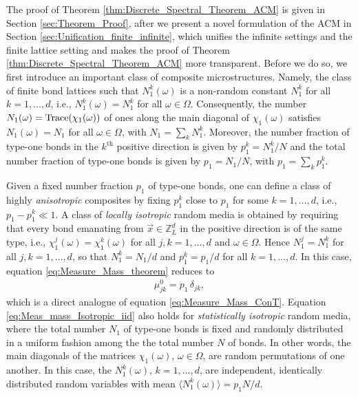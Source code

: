 \documentclass{cmslatex}
\begin{document}
The proof of Theorem \ref{thm:Discrete_Spectral_Theorem_ACM} is given
in Section \ref{sec:Theorem_Proof}, after we present a novel
formulation of the ACM in Section
\ref{sec:Unification_finite_infinite}, which unifies the infinite
settings and the finite lattice setting and makes the proof of
Theorem \ref{thm:Discrete_Spectral_Theorem_ACM} more
transparent. Before we do so, we first introduce an important class of
composite microstructures. Namely, the 
class of finite bond lattices such that $N_1^k(\omega)$ is a non-random
constant $N_1^k$ for all $k=1,\ldots,d$, i.e., $N_1^k(\omega)=N_1^k$ for all
$\omega\in\Omega$. Consequently, the number $N_1(\omega)={\rm Trace}(\chi_1(\omega))$ of ones
along the main diagonal of $\chi_1(\omega)$ satisfies $N_1(\omega)=N_1$ for all
$\omega\in\Omega$, with $N_1=\sum_kN_1^k$. Moreover, the number fraction of type-one
bonds in the $k^{\text{th}}$ positive direction is given by
$p_1^k=N_1^k/N$ and the total number fraction of type-one bonds is
given by $p_1=N_1/N$, with $p_1=\sum_kp_1^k$.





Given a fixed number
fraction $p_1$ of type-one  
bonds, one can define a class of highly \emph{anisotropic} composites
by fixing $p_1^k$ close to $p_1$ for some $k=1,\ldots,d$,
i.e., $p_1-p_1^k\ll1$. A class of \emph{locally isotropic} random media is 
obtained by requiring that every bond emanating from
$\vec{x}\in\mathbb{Z}^d_L$ in the positive direction is of the same
type, i.e., $\chi_1^j(\omega)=\chi_1^k(\omega)$ for all $j,k=1,\ldots,d$ and $\omega\in\Omega$. Hence
$N_1^j=N_1^k$ for all $j,k=1,\ldots,d$, so that $N_1^k=N_1/d$ and
$p_1^k=p_1/d$ for all $k=1,\ldots,d$. In this case, equation
\eqref{eq:Measure_Mass_theorem} reduces to 
% 
\begin{align}\label{eq:Meas_mass_Isotropic_iid}
  \mu_{jk}^0=p_1\,\delta_{jk},
\end{align}
%
which is a direct analogue of equation \eqref{eq:Measure_Mass_ConT}.
Equation \eqref{eq:Meas_mass_Isotropic_iid} also holds for
\emph{statistically isotropic} random media, where the total number
$N_1$ of type-one bonds is fixed and randomly distributed in a uniform
fashion among the the total number $N$ of bonds. In other words, the 
main diagonals of the matrices $\chi_1(\omega)$, $\omega\in\Omega$, are random
permutations of one another.  In this case, the
$N_1^k(\omega)$, $k=1,\ldots,d$, are independent, identically distributed random
variables with mean $\langle N_1^k(\omega)\rangle=p_1N/d$.
\end{document}
